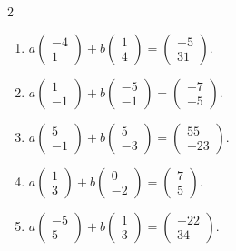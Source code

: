 \begin{multicols}{2}
\begin{enumerate}[label=\arabic*.,  leftmargin=*]
\item $a\begin{pmatrix} -4 \\ 1 \end{pmatrix} + b\begin{pmatrix} 1 \\ 4 \end{pmatrix} = \begin{pmatrix} -5 \\ 31 \end{pmatrix}$.
\item $a\begin{pmatrix} 1 \\ -1 \end{pmatrix} + b\begin{pmatrix} -5 \\ -1 \end{pmatrix} = \begin{pmatrix} -7 \\ -5 \end{pmatrix}$.
\item $a\begin{pmatrix} 5 \\ -1 \end{pmatrix} + b\begin{pmatrix} 5 \\ -3 \end{pmatrix} = \begin{pmatrix} 55 \\ -23 \end{pmatrix}$.
\item $a\begin{pmatrix} 1 \\ 3 \end{pmatrix} + b\begin{pmatrix} 0 \\ -2 \end{pmatrix} = \begin{pmatrix} 7 \\ 5 \end{pmatrix}$.
\item $a\begin{pmatrix} -5 \\ 5 \end{pmatrix} + b\begin{pmatrix} 1 \\ 3 \end{pmatrix} = \begin{pmatrix} -22 \\ 34 \end{pmatrix}$.

\end{enumerate}
\end{multicols}
